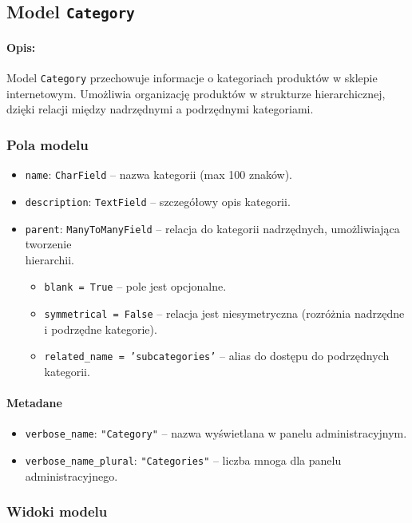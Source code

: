 \documentclass[12pt,a4paper,oneside]{article}
\theoremstyle{definition}
\numberwithin{equation}{section}
\begin{document}
%
\subsection{Model \texttt{Category}}
\paragraph{Opis:}
Model \texttt{Category} przechowuje informacje o kategoriach produktów w sklepie internetowym. Umożliwia organizację produktów w strukturze hierarchicznej, dzięki relacji między nadrzędnymi a podrzędnymi kategoriami.

\subsubsection{Pola modelu}
\begin{itemize}
    \item \texttt{name}: \texttt{CharField} – nazwa kategorii (max 100 znaków).
    \item \texttt{description}: \texttt{TextField} – szczegółowy opis kategorii.
    \item \texttt{parent}: \texttt{ManyToManyField} – relacja do kategorii nadrzędnych, umożliwiająca tworzenie\\ hierarchii.
    \begin{itemize}
        \item \texttt{blank = True} – pole jest opcjonalne.
        \item \texttt{symmetrical = False} – relacja jest niesymetryczna (rozróżnia nadrzędne i podrzędne kategorie).
        \item \texttt{related\_name = 'subcategories'} – alias do dostępu do podrzędnych kategorii.
    \end{itemize}
\end{itemize}

\paragraph{Metadane}
\begin{itemize}
    \item \texttt{verbose\_name}: \texttt{"Category"} – nazwa wyświetlana w panelu administracyjnym.
    \item \texttt{verbose\_name\_plural}: \texttt{"Categories"} – liczba mnoga dla panelu administracyjnego.
\end{itemize}


\subsubsection{Widoki modelu}
\end{document}
